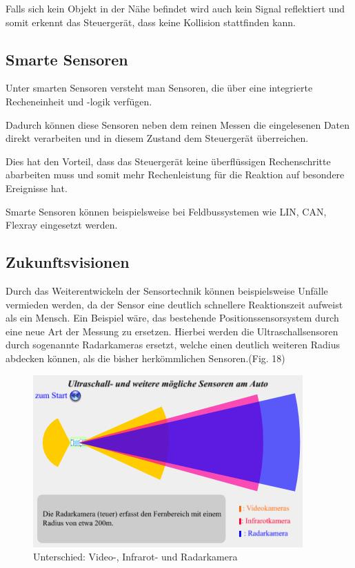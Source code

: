                  Falls sich kein Objekt in der Nähe befindet wird auch kein Signal reflektiert und somit erkennt das Steuergerät, dass keine Kollision stattfinden kann.

                \subsection{Smarte Sensoren} 
                 Unter smarten Sensoren versteht man Sensoren, die über eine integrierte Recheneinheit und -logik verfügen.
                 
                 Dadurch können diese Sensoren neben dem reinen Messen die eingelesenen Daten direkt verarbeiten und in diesem Zustand dem Steuergerät überreichen. 
                 
                 Dies hat den Vorteil, dass das Steuergerät keine überflüssigen Rechenschritte abarbeiten muss und somit mehr Rechenleistung für die Reaktion auf besondere Ereignisse hat.

                 Smarte Sensoren können beispielsweise bei Feldbussystemen wie LIN, CAN, Flexray eingesetzt werden.		
             
             
             
             \subsection{Zukunftsvisionen} 
                  Durch das Weiterentwickeln der Sensortechnik können beispielsweise Unfälle vermieden werden, da der Sensor eine deutlich schnellere Reaktionszeit aufweist als ein Mensch.
                  Ein Beispiel wäre, das bestehende Positionssensorsystem durch eine neue Art der Messung zu ersetzen. Hierbei werden die Ultraschallsensoren 
                  durch sogenannte Radarkameras ersetzt, welche einen deutlich weiteren Radius abdecken können, als die bisher herkömmlichen Sensoren.(Fig. 18)
                  
                  \begin{figure}
                      \includegraphics[width=\textwidth] {radarsensor.png}
                      \caption[www.leifiphysik.de/akustik/schallgeschwindigkeit/ausblick/ultraschall-beim-auto]{Unterschied: Video-, Infrarot- und Radarkamera}
                      \label{fig:TS12}
                  \end{figure}
     
